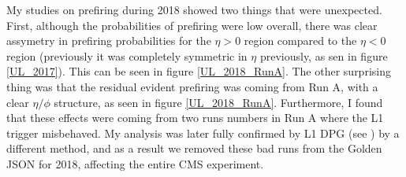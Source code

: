 My studies on prefiring during 2018 showed two things that were unexpected. First, although the probabilities of prefiring were low overall, there was clear assymetry in prefiring probabilities for the $\eta>0$ region compared to the $\eta<0$ region (previously it was completely symmetric in $\eta$ previously, as sen in figure \ref{UL_2017}). This can be seen in figure \ref{UL_2018_RunA}. The other surprising thing was that the residual evident prefiring was coming from Run A, with a clear $\eta/ \phi$ structure, as seen in figure \ref{UL_2018_RunA}. Furthermore, I found that these effects were coming from two runs numbers in Run A where the L1 trigger misbehaved. My analysis was later fully confirmed by L1 DPG (see \cite{L1DPG}) by a different method, and as a result we removed these bad runs from the Golden JSON for 2018, affecting the entire CMS experiment.

